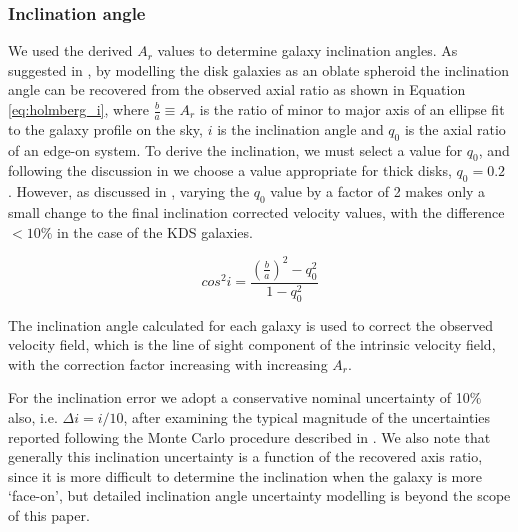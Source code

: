 \documentclass[fleqn,usenatbib]{mn2e}
\begin{document}
\subsubsection{Inclination angle}\label{subsubsection:inclination_angle}
We used the derived $A_{r}$ values to determine galaxy inclination angles.
As suggested in \cite{Holmberg1958}, by modelling the disk galaxies as an oblate spheroid the inclination angle can be recovered from the observed axial ratio as shown in Equation \ref{eq:holmberg_i}, where $\frac{b}{a} \equiv A_{r}$ is the ratio of minor to major axis of an ellipse fit to the galaxy profile on the sky, $i$ is the inclination angle and $q_{0}$ is the axial ratio of an edge-on system.
To derive the inclination, we must select a value for $q_{0}$, and following the discussion in \citep{Law2012a} we choose a value appropriate for thick disks, $q_{0} = 0.2$ \citep[e.g.][]{Epinat2012,Harrison2017}.
However, as discussed in \cite{Harrison2017}, varying the $q_{0}$ value by a factor of 2 makes only a small change to the final inclination corrected velocity values, with the difference $<10\%$ in the case of the KDS galaxies.

\begin{equation}\label{eq:holmberg_i}
   cos^{2}i = \frac{\left(\frac{b}{a}\right)^{2} - q_{0}^{2}}{1 - q_{0}^{2}}
\end{equation}

The inclination angle calculated for each galaxy is used to correct the observed velocity field, which is the line of sight component of the intrinsic velocity field, with the correction factor increasing with increasing $A_{r}$.

For the inclination error we adopt a conservative nominal uncertainty of 10$\%$ also, i.e. $\Delta i = i / 10$, after examining the typical magnitude of the uncertainties reported following the Monte Carlo procedure described in \cite{Epinat2012}.
We also note that generally this inclination uncertainty is a function of the recovered axis ratio, since it is more difficult to determine the inclination when the galaxy is more `face-on', but detailed inclination angle uncertainty modelling is beyond the scope of this paper.
\end{document}
